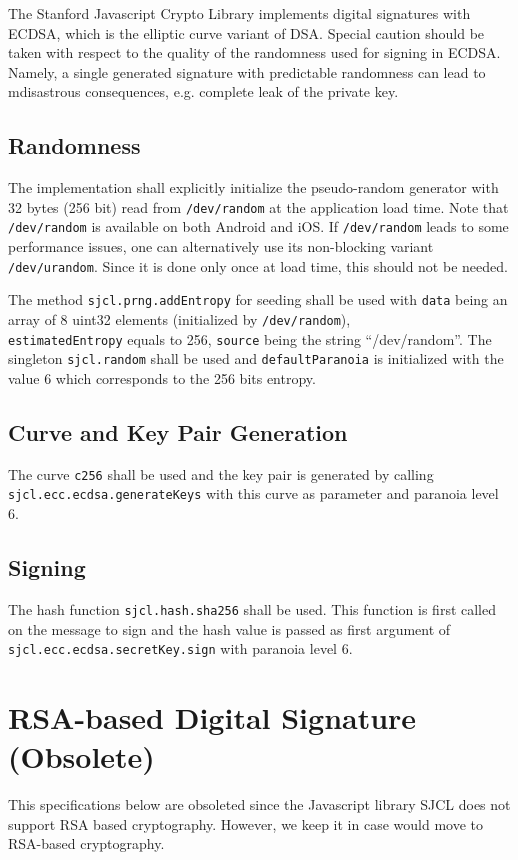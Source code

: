 \documentclass[a4paper,10pt]{article}
\begin{document}
The Stanford Javascript Crypto Library implements digital signatures with ECDSA, which is the elliptic curve variant of DSA. Special caution should be taken with respect to the 
quality of the randomness used for signing in ECDSA. Namely, a single generated signature with predictable randomness can lead to mdisastrous consequences, e.g. complete leak of 
the private key.

\subsection{Randomness}
The implementation shall explicitly initialize the pseudo-random generator with 32 bytes (256 bit) read from \texttt{/dev/random} at the application load time. Note that 
\texttt{/dev/random} is available on both Android and iOS. If \texttt{/dev/random} leads to some performance issues, one can alternatively use its non-blocking variant 
\texttt{/dev/urandom}. Since it is done only once at load time, this should not be needed.

The method \texttt{sjcl.prng.addEntropy} for seeding shall be used with \texttt{data} being an array of 8 uint32 elements (initialized by \texttt{/dev/random}),\\ 
\texttt{estimatedEntropy} equals to 256, \texttt{source} being the string ``/dev/random''. The singleton \texttt{sjcl.random} shall be used and \texttt{defaultParanoia} is 
initialized with the value 6 which corresponds to the 256 bits entropy.

\subsection{Curve and Key Pair Generation}
The curve \texttt{c256} shall be used and the key pair is generated by calling\\\texttt{sjcl.ecc.ecdsa.generateKeys} with this curve as parameter and paranoia level 6.

\subsection{Signing}
The hash function \texttt{sjcl.hash.sha256} shall be used. This function is first called on the message to sign and the hash value is passed as first argument of 
\texttt{sjcl.ecc.ecdsa.secretKey.sign} with paranoia level 6.

\section{RSA-based Digital Signature (Obsolete)}
This specifications below are obsoleted since the Javascript library SJCL does not support RSA based cryptography.  However, we keep it in case would move to RSA-based 
cryptography.
\end{document}
